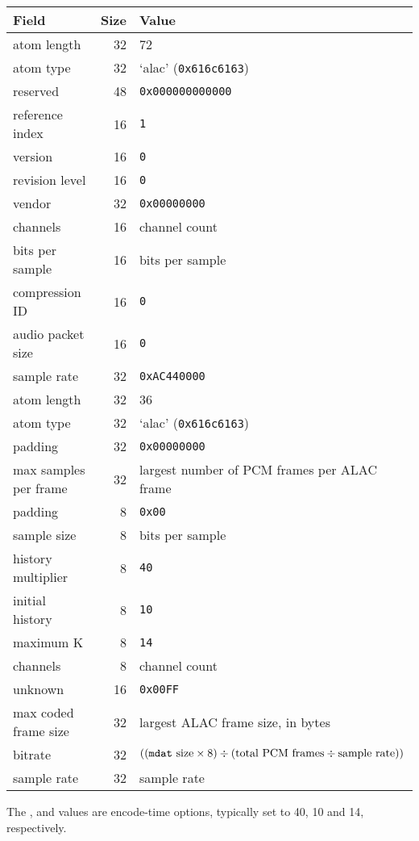\begin{table}[h]
\begin{tabular}{|l|r|l|}
\hline
Field & Size & Value \\
\hline
atom length & 32 & 72 \\
atom type & 32 & `alac' (\texttt{0x616c6163}) \\
\hline
reserved & 48 & \texttt{0x000000000000} \\
reference index & 16 & \texttt{1} \\
version & 16 & \texttt{0} \\
revision level & 16 & \texttt{0} \\
vendor & 32 & \texttt{0x00000000} \\
channels & 16 & channel count \\
bits per sample & 16 & bits per sample \\
compression ID & 16 & \texttt{0} \\
audio packet size & 16 & \texttt{0} \\
sample rate & 32 & \texttt{0xAC440000} \\
\hline
\hline
atom length & 32 & 36 \\
atom type & 32 & `alac' (\texttt{0x616c6163}) \\
\hline
padding & 32 & \texttt{0x00000000} \\
max samples per frame & 32 & largest number of PCM frames per ALAC frame \\
padding & 8 & \texttt{0x00} \\
sample size & 8 & bits per sample \\
history multiplier & 8 & \texttt{40} \\
initial history & 8 & \texttt{10} \\
maximum K & 8 & \texttt{14} \\
channels & 8 & channel count \\
unknown & 16 & \texttt{0x00FF} \\
max coded frame size & 32 & largest ALAC frame size, in bytes \\
bitrate & 32 & $((\text{\texttt{mdat} size} \times 8 ) \div (\text{total PCM frames} \div \text{sample rate}))$ \\
sample rate & 32 & sample rate \\
\hline
\end{tabular}
\end{table}
The ,  and 
values are encode-time options, typically set to 40, 10 and 14,
respectively.

